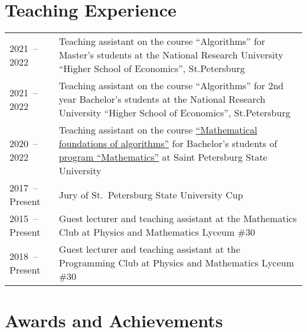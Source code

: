 \documentclass[a4paper, 11pt]{article}
\begin{document}
\section*{Teaching Experience}

\begin{tabularx}{\textwidth}{lX}
	2021~-- 2022 & Teaching assistant on the course ``Algorithms'' for Master's students at the National Research University ``Higher School of Economics'', St.Petersburg \\

	2021~-- 2022 & Teaching assistant on the course ``Algorithms'' for 2nd year Bachelor's students at the National Research University ``Higher School of Economics'', St.Petersburg  \\

	2020~-- 2022 & Teaching assistant on the course \href{https://users.math-cs.spbu.ru/~okhotin/teaching/algorithms_2020/}{``Mathematical foundations of algorithms''} for Bachelor's students of \href{https://math-cs.spbu.ru/en/}{program ``Mathematics''} at Saint Petersburg State University \\

	2017~-- Present & Jury of St.~Petersburg State University Cup \\

	2015~-- Present & Guest lecturer and teaching assistant at the Mathematics Club at Physics and Mathematics Lyceum \#30 \\

	2018~-- Present & Guest lecturer and teaching assistant at the Programming Club at Physics and Mathematics Lyceum \#30
\end{tabularx}

\section*{Awards and Achievements}
\end{document}
